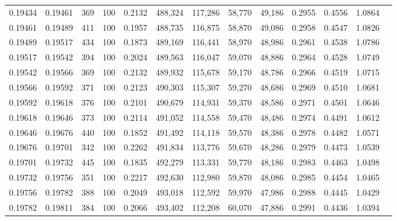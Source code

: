 \begin{tabular}{rrrrrrrrrrrrr}
0.19434 & 0.19461 &   369 & 100 &                                     0.2132 & 488,324 & 117,286 &  58,770 &  49,186 & 0.2955 & 0.4556 & 1.0864 \\
0.19461 & 0.19489 &   411 & 100 &                                     0.1957 & 488,735 & 116,875 &  58,870 &  49,086 & 0.2958 & 0.4547 & 1.0826 \\
0.19489 & 0.19517 &   434 & 100 &                                     0.1873 & 489,169 & 116,441 &  58,970 &  48,986 & 0.2961 & 0.4538 & 1.0786 \\
0.19517 & 0.19542 &   394 & 100 &                                     0.2024 & 489,563 & 116,047 &  59,070 &  48,886 & 0.2964 & 0.4528 & 1.0749 \\
0.19542 & 0.19566 &   369 & 100 &                                     0.2132 & 489,932 & 115,678 &  59,170 &  48,786 & 0.2966 & 0.4519 & 1.0715 \\
0.19566 & 0.19592 &   371 & 100 &                                     0.2123 & 490,303 & 115,307 &  59,270 &  48,686 & 0.2969 & 0.4510 & 1.0681 \\
0.19592 & 0.19618 &   376 & 100 &                                     0.2101 & 490,679 & 114,931 &  59,370 &  48,586 & 0.2971 & 0.4501 & 1.0646 \\
0.19618 & 0.19646 &   373 & 100 &                                     0.2114 & 491,052 & 114,558 &  59,470 &  48,486 & 0.2974 & 0.4491 & 1.0612 \\
0.19646 & 0.19676 &   440 & 100 &                                     0.1852 & 491,492 & 114,118 &  59,570 &  48,386 & 0.2978 & 0.4482 & 1.0571 \\
0.19676 & 0.19701 &   342 & 100 &                                     0.2262 & 491,834 & 113,776 &  59,670 &  48,286 & 0.2979 & 0.4473 & 1.0539 \\
0.19701 & 0.19732 &   445 & 100 &                                     0.1835 & 492,279 & 113,331 &  59,770 &  48,186 & 0.2983 & 0.4463 & 1.0498 \\
0.19732 & 0.19756 &   351 & 100 &                                     0.2217 & 492,630 & 112,980 &  59,870 &  48,086 & 0.2985 & 0.4454 & 1.0465 \\
0.19756 & 0.19782 &   388 & 100 &                                     0.2049 & 493,018 & 112,592 &  59,970 &  47,986 & 0.2988 & 0.4445 & 1.0429 \\
0.19782 & 0.19811 &   384 & 100 &                                     0.2066 & 493,402 & 112,208 &  60,070 &  47,886 & 0.2991 & 0.4436 & 1.0394 \\

\end{tabular}

